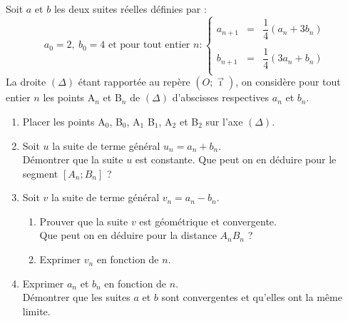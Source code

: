 \begin{exercice}
Soit $a$ et $b$ les deux suites r\'eelles d\'efinies par : 
$$ 
a_0=2, \ b_0=4 \textrm{ et pour tout entier } n : 
\left\{ 
\begin{array}{ccc} 
a_{n+1} & = & \dfrac{1}{4} (a_n+3b_n)\\ 
\\ 
b_{n+1} & = & \dfrac{1}{4} (3a_n+b_n)\\ 
\end{array} 
\right. 
$$ 
\noindent 
La droite $(\Delta)$ \'etant rapport\'ee au rep\`ere $(O;\vec{\imath})$, on 
consid\`ere pour tout entier $n$ les points A$_n$ et B$_n$ de $(\Delta)$ 
d'abscisses respectives $a_n$ et $b_n$. 
\begin{enumerate} 
\item Placer les points A$_0$, B$_0$, A$_1$ B$_1$, A$_2$ et B$_2$ sur 
 l'axe $(\Delta)$. 
\item Soit $u$ la suite de terme g\'en\'eral $ u_n=a_n+b_n$.\\ 
D\'emontrer que la suite $u$ est constante. Que peut on en d\'eduire pour le 
segment $[A_n;B_n]$ ? 
\item Soit $v$ la suite de terme g\'en\'eral $v_n=a_n-b_n$. 
 \begin{enumerate}
 \item Prouver que la suite $v$ est g\'eom\'etrique et convergente.\\ 
 Que peut on en d\'eduire pour la distance $A_nB_n$ ? 
 \item Exprimer $v_n$ en fonction de $n$. 
 \end{enumerate} 
\item Exprimer $a_n$ et $b_n$ en fonction de $n$.\\ 
 D\'emontrer que les suites $a$ et $b$ sont convergentes et qu'elles ont 
 la m\^eme limite. 
\end{enumerate} 
 \end{exercice}
